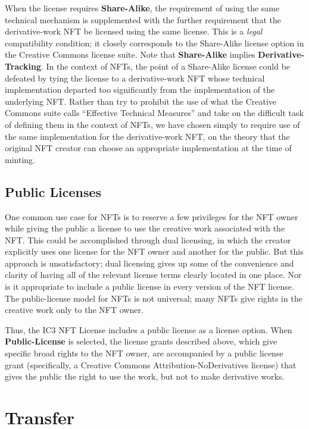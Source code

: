 \documentclass{article}
\newcommand{\keyword}[1]{\textbf{#1}\xspace}
\newcommand{\publiclicense}{\keyword{Public-License}}
\newcommand{\sharealike}{\keyword{Share-Alike}}
\newcommand{\derivativetracking}{\keyword{Derivative-Tracking}}
\begin{document}
When the license requires \sharealike, the requirement of using the same technical mechanism is supplemented with the further requirement that the derivative-work NFT be licensed using the same license. This is a \emph{legal} compatibility condition; it closely corresponds to the Share-Alike license option in the Creative Commons license suite. Note that \sharealike implies \derivativetracking. In the context of NFTs, the point of a Share-Alike license could be defeated by tying the license to a derivative-work NFT whose technical implementation departed too significantly from the implementation of the underlying NFT. Rather than try to prohibit the use of what the Creative Commons suite calls ``Effective Technical Measures'' and take on the difficult task of defining them in the context of NFTs, we have chosen simply to require use of the same implementation for the derivative-work NFT, on the theory that the original NFT creator can choose an appropriate implementation at the time of minting.

\subsection{Public Licenses}

One common use case for NFTs is to reserve a few privileges for the NFT owner while giving the public a license to use the creative work associated with the NFT. This could be accomplished through dual licensing, in which the creator explicitly uses one license for the NFT owner and another for the public. But this approach is unsatisfactory; dual licensing gives up some of the convenience and clarity of having all of the relevant license terms clearly located in one place. Nor is it appropriate to include a public license in every version of the NFT license. The public-license model for NFTs is not universal; many NFTs give rights in the creative work only to the NFT owner.

Thus, the IC3 NFT License includes a public license as a license option. When \publiclicense is selected, the license grants described above, which give specific broad rights to the NFT owner, are accompanied by a public license grant (specifically, a Creative Commons Attribution-NoDerivatives license) that gives the public the right to use the work, but not to make derivative works.



\section{Transfer}
\label{sec:trans}
\end{document}
